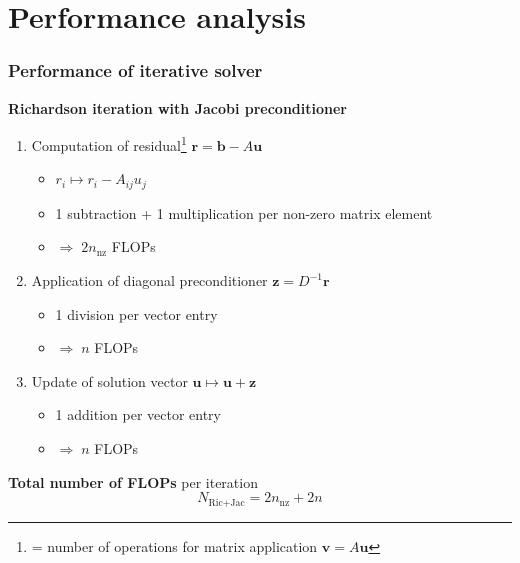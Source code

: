 \documentclass{beamer}
\renewcommand{\vec}[1]{\boldsymbol{#1}}
\begin{document}

\section{Performance analysis}

\begin{frame}
  \tableofcontents[currentsection]
\end{frame}


\begin{frame}
  \frametitle{Performance of iterative solver}
  \textbf{Richardson iteration with Jacobi preconditioner}
  \begin{enumerate}
  \item Computation of residual\footnote{= number of operations for matrix application $\boldsymbol{v} = A\boldsymbol{u}$} $\vec{r} = \vec{b} - A\vec{u}$
  \begin{itemize}
  \item $r_i \mapsto r_i - A_{ij} u_j$
  \item 1 subtraction + 1 multiplication per non-zero matrix element 
  \item $\Rightarrow\;2n_{\text{nz}}$ FLOPs
  \end{itemize}
  \item Application of diagonal preconditioner $\boldsymbol{z} = D^{-1} \boldsymbol{r}$
  \begin{itemize}
  \item 1 division per vector entry
  \item $\Rightarrow\;n$ FLOPs
  \end{itemize}
  \item Update of solution vector $\boldsymbol{u}\mapsto \boldsymbol{u} + \boldsymbol{z}$
  \begin{itemize}
  \item 1 addition per vector entry
  \item $\Rightarrow\;n$ FLOPs
  \end{itemize}
  \end{enumerate}
\textbf{Total number of FLOPs} per iteration
$$
N_{\text{Ric+Jac}} = 2n_{\text{nz}} + 2n
$$
\end{frame}

\end{document}
